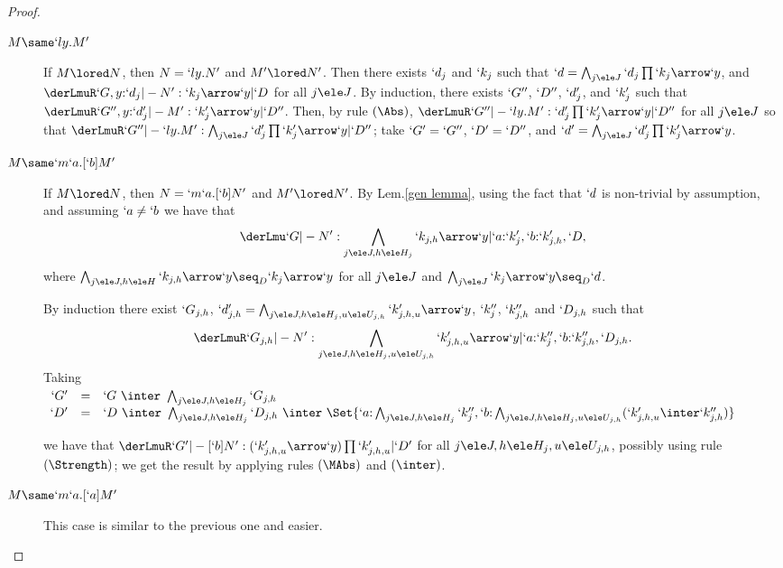 \documentclass{CSML}
\begin{document}
\begin{proof}
\begin{description}
 \item [$ M \same `ly.M' $] 
If $M \lored N$, then $N = `ly.N'$ and $M' \lored N'$.
Then there exists $`d_j$ and $`k_j$ such that $`d = \bigwedge_{j\ele J} `d_j\prod `k_j\arrow `y$, and $\derLmuR `G,y{:}`d_j |- N' : `k_j\arrow `y | `D $ for all $j\ele J$.
By induction, there exists $`G''$, $`D''$, $`d'_j$, and $`k'_j$ such that $\derLmuR `G'',y{:}`d'_j |- M' : `k'_j\arrow `y | `D'' $.
Then, by rule $(\Abs)$, $\derLmuR `G'' |- `ly.M' : `d'_j\prod `k'_j\arrow `y | `D'' $ for all $j\ele J$ so that $\derLmuR `G'' |- `ly.M' : \bigwedge_{j\ele J}`d'_j\prod `k'_j\arrow `y | `D'' $;  take $`G' = `G''$, $`D' = `D''$, and $`d' = \bigwedge_{j\ele J}`d'_j\prod `k'_j\arrow `y$.


 \item [{$M \same `m`a.[`b]M'$}]
 If $M \lored N$, then $N = `m`a.[`b]N'$ and $M' \lored N'$. By Lem.\skp\ref{gen lemma}, using the fact that $`d$ is non-trivial by assumption, and assuming $`a\neq`b$ we have that 
 \[
\derLmu `G |- N' : \bigwedge_{j\ele J, h\ele H_j}`k_{j,h}\arrow `y | `a{:}`k'_j, `b{:}`k'_{j,h},`D ,
 \]
where $ \bigwedge_{j\ele J, h\ele H} `k_{j,h}\arrow `y \seq_D `k_j\arrow`y$ for all $j\ele J$ and $\bigwedge _{j\ele J}`k_j\arrow`y \seq_D `d$.
 
By induction there exist $`G_{j,h}$, $`d'_{j,h} = \bigwedge_{j\ele J, h\ele H_j, u\ele U_{j,h}} `k'_{j,h,u}\arrow`y$, $`k''_j$, $`k''_{j,h}$ and $`D_{j,h}$ such that 
 \[
\derLmuR `G_{j,h} |- N' : {\bigwedge_{j\ele J, h\ele H_j, u\ele U_{j,h}} `k'_{j,h,u}\arrow`y} | `a{:}`k''_j, `b{:}`k''_{j,h},`D_{j,h} .
 \] 
Taking
 $ \begin{array}[t]{rcl}
`G' &=&`G \ \inter \ \bigwedge_{j\ele J, h\ele H_j}`G_{j,h} \\
`D' &=& `D \ \inter \ \bigwedge_{j\ele J, h\ele H_j}`D_{j,h} %
\ \inter \ \Set{`a{:} \bigwedge_{j\ele J, h\ele H_j}`k''_j, `b{:} \bigwedge_{j\ele J, h\ele H_j, u\ele U_{j,h}}(`k'_{j,h,u} \inter`k''_{j,h})}
 \end{array} $

\noindent
we have that $\derLmuR `G' |- {[`b]N'} : (`k'_{j,h,u}\arrow`y)\prod `k'_{j,h,u} | `D' $ for all $j\ele J, h\ele H_j, u\ele U_{j,h}$, possibly using rule $(\Strength)$; we get the result by applying rules $(\MAbs)$ and $(\inter)$.
	
 \item [{$M \same `m`a.[`a]M'$}]
This case is similar to the previous one and easier. \qedhere
 \end{description}
 \end{proof}
\end{document}
